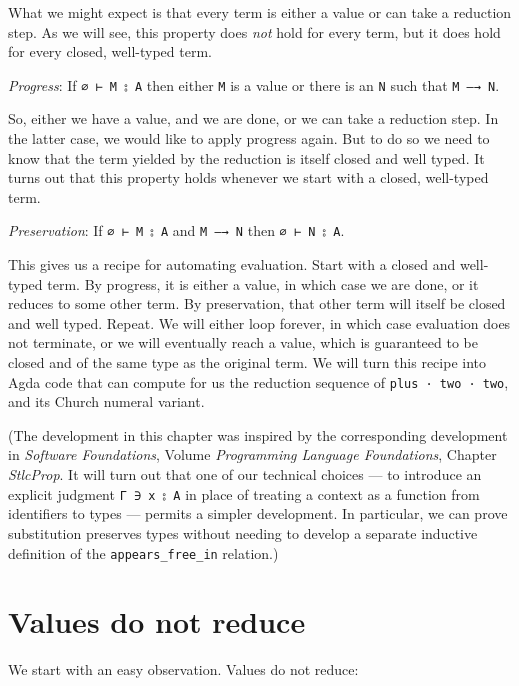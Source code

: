 What we might expect is that every term is either a value or can take a
reduction step. As we will see, this property does \emph{not} hold for
every term, but it does hold for every closed, well-typed term.

\emph{Progress}: If \texttt{∅\ ⊢\ M\ ⦂\ A} then either \texttt{M} is a
value or there is an \texttt{N} such that \texttt{M\ —→\ N}.

So, either we have a value, and we are done, or we can take a reduction
step. In the latter case, we would like to apply progress again. But to
do so we need to know that the term yielded by the reduction is itself
closed and well typed. It turns out that this property holds whenever we
start with a closed, well-typed term.

\emph{Preservation}: If \texttt{∅\ ⊢\ M\ ⦂\ A} and \texttt{M\ —→\ N}
then \texttt{∅\ ⊢\ N\ ⦂\ A}.

This gives us a recipe for automating evaluation. Start with a closed
and well-typed term. By progress, it is either a value, in which case we
are done, or it reduces to some other term. By preservation, that other
term will itself be closed and well typed. Repeat. We will either loop
forever, in which case evaluation does not terminate, or we will
eventually reach a value, which is guaranteed to be closed and of the
same type as the original term. We will turn this recipe into Agda code
that can compute for us the reduction sequence of
\texttt{plus\ ·\ two\ ·\ two}, and its Church numeral variant.

(The development in this chapter was inspired by the corresponding
development in \emph{Software Foundations}, Volume \emph{Programming
Language Foundations}, Chapter \emph{StlcProp}. It will turn out that
one of our technical choices --- to introduce an explicit judgment
\texttt{Γ\ ∋\ x\ ⦂\ A} in place of treating a context as a function from
identifiers to types --- permits a simpler development. In particular,
we can prove substitution preserves types without needing to develop a
separate inductive definition of the \texttt{appears\_free\_in}
relation.)

\hypertarget{values-do-not-reduce}{%
\section{Values do not reduce}\label{values-do-not-reduce}}

We start with an easy observation. Values do not reduce:

